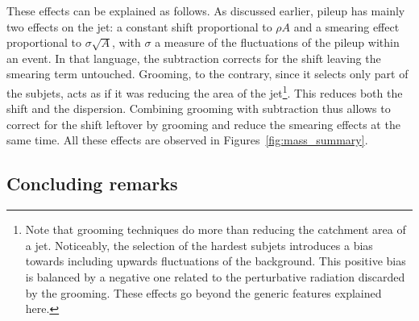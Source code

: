 
These effects can be explained as follows. As discussed earlier,
pileup has mainly two effects on the jet: a constant shift
proportional to $\rho A$ and a smearing effect proportional to $\sigma
\sqrt{A}$, with $\sigma$ a measure of the fluctuations of the pileup
within an event. In that language, the subtraction corrects for the
shift leaving the smearing term untouched. Grooming, to the contrary,
since it selects only part of the subjets, acts as if it was reducing
the area of the jet\footnote{Note that grooming techniques do more
  than reducing the catchment area of a jet. Noticeably, the selection
  of the hardest subjets introduces a bias towards including upwards
  fluctuations of the background. This positive bias is balanced by a
  negative one related to the perturbative radiation discarded by the
  grooming. These effects go beyond the generic features explained
  here.}. This reduces both the shift and the dispersion. Combining
grooming with subtraction thus allows to correct for the shift
leftover by grooming and reduce the smearing effects at the same
time. All these effects are observed in Figures~\ref{fig:mass_summary}.
  




\subsection{Concluding remarks}\label{subsec:concl}

